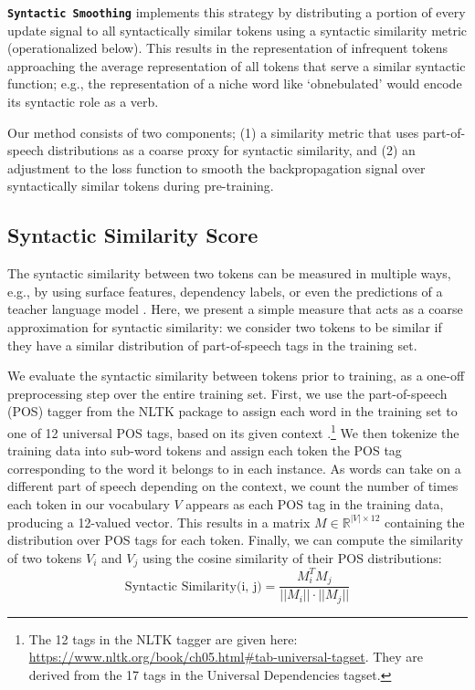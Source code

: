 \textbf{\texttt{Syntactic Smoothing}} implements this strategy by distributing a portion of every update signal to all syntactically similar tokens using a syntactic similarity metric (operationalized below). This results in the representation of infrequent tokens approaching the average representation of all tokens that serve a similar syntactic function; e.g., the representation of a niche word like `obnebulated' would encode its syntactic role as a verb.

Our method consists of two components; (1) a similarity metric that uses part-of-speech distributions as a coarse proxy for syntactic similarity, and (2) an adjustment to the loss function to smooth the backpropagation signal over syntactically similar tokens during pre-training. 

\subsection{Syntactic Similarity Score}\label{sec:sim}

The syntactic similarity between two tokens can be measured in multiple ways, e.g., by using surface features, dependency labels, or even the predictions of a teacher language model \citep{hinton2015distilling}. Here, we present a simple measure that acts as a coarse approximation for syntactic similarity: we consider two tokens to be similar if they have a similar distribution of part-of-speech tags in the training set.

We evaluate the syntactic similarity between tokens prior to training, as a one-off preprocessing step over the entire training set. First, we use the part-of-speech (POS) tagger from the NLTK package \citep{bird2009natural} to assign each word in the training set to one of 12 universal POS tags, based on its given context \citep{petrov2012universalpos}.\footnote{The 12 tags in the NLTK tagger are given here: \url{https://www.nltk.org/book/ch05.html\#tab-universal-tagset}. They are derived from the 17 tags in the Universal Dependencies tagset.} We then tokenize the training data into sub-word tokens and assign each token the POS tag corresponding to the word it belongs to in each instance. As words can take on a different part of speech depending on the context, we count the number of times each token in our vocabulary $V$ appears as each POS tag in the training data, producing a 12-valued vector. This results in a matrix $M \in \mathbb{R}^{|V|\times 12}$ containing the distribution over POS tags for each token. Finally, we can compute the similarity of two tokens $V_i$ and $V_j$ using the cosine similarity of their POS distributions: $$ \text{Syntactic Similarity(i, j)} = \frac{M_i^TM_j}{||M_i|| \cdot ||M_j||}$$ 


